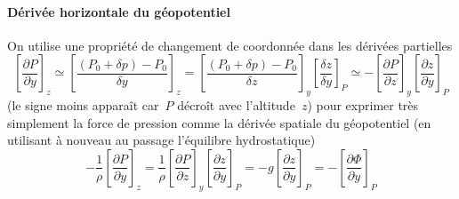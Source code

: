 \sk
\paragraph{Dérivée horizontale du géopotentiel} On utilise une propriété de changement de coordonnée dans les dérivées partielles
\[ 
\left[ \frac{\partial P}{\partial y} \right]_z
\simeq
\left[ \frac{(P_0 + \delta p) - P_0}{\delta y} \right]_z 
=
\left[ \frac{(P_0 + \delta p) - P_0}{\delta z} \right]_y
\left[ \frac{\delta z}{\delta y} \right]_P
\simeq
-\left[ \frac{\partial P}{\partial z} \right]_y \left[ \frac{\partial z}{\partial y} \right]_P
\]
(le signe moins apparaît car~$P$ décroît avec l'altitude~$z$) pour exprimer très simplement la force de pression comme la dérivée spatiale du géopotentiel (en utilisant à nouveau au passage l'équilibre hydrostatique)
\[ -\frac{1}{\rho} \left[ \frac{\partial P}{\partial y} \right]_z
= \frac{1}{\rho} \left[ \frac{\partial P}{\partial z} \right]_y \left[ \frac{\partial z}{\partial y} \right]_P
= -g \left[ \frac{\partial z}{\partial y} \right]_P
= -\left[ \frac{\partial \Phi}{\partial y} \right]_P
\]
